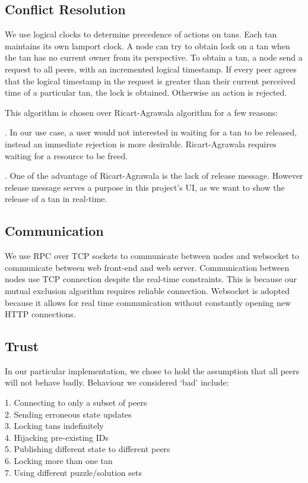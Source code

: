 \documentclass[twocolumn]{article}
\begin{document}
\subsection{Conflict Resolution}
We use logical clocks to determine precedence of actions on tans. Each tan maintains its own lamport clock. A node can try to obtain lock on a tan when the tan has no current owner from its perspective. To obtain a tan, a node send a request to all peers, with an incremented logical timestamp. If every peer agrees that the logical timestamp in the request is greater than their current perceived time of a particular tan, the lock is obtained. Otherwise an action is rejected.

This algorithm is chosen over Ricart-Agrawala algorithm for a few reasons:

. In our use case, a user would not interested in waiting for a tan to be released, instead an immediate rejection is more desirable. Ricart-Agrawala requires waiting for a resource to be freed.

. One of the advantage of Ricart-Agrawala is the lack of release message. However release message serves a purpose in this project’s UI, as we want to show the release of a tan in real-time.

\subsection{Communication}
We use RPC over TCP sockets to communicate between nodes and websocket to communicate between web front-end and web server. Communication between nodes use TCP connection despite the real-time constraints. This is because our mutual exclusion algorithm requires reliable connection. Websocket is adopted because it allows for real time communication without constantly opening new HTTP connections.

\subsection{Trust}
In our particular implementation, we chose to hold the assumption that all peers will not behave badly. Behaviour we considered ‘bad’ include:

\begin{flushleft}
1. Connecting to only a subset of peers\\
2. Sending erroneous state updates\\
3. Locking tans indefinitely\\
4. Hijacking pre-existing IDs\\
5. Publishing different state to different peers\\
6. Locking more than one tan\\
7. Using different puzzle/solution sets
\end{flushleft}
\end{document}
